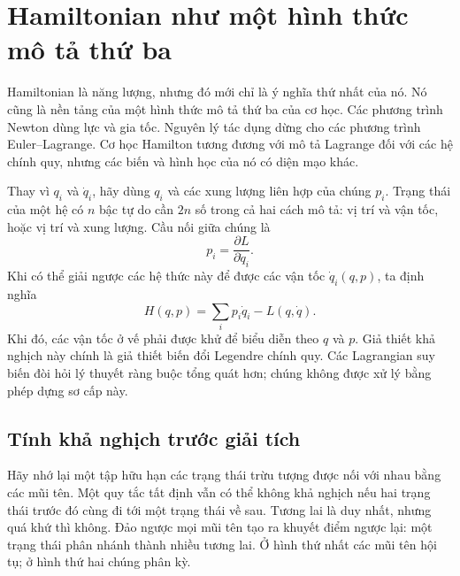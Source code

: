 \begin{classroomqa}
\end{classroomqa}

\section{Hamiltonian như một hình thức mô tả thứ ba}

Hamiltonian là năng lượng, nhưng đó mới chỉ là ý nghĩa thứ nhất của nó. Nó cũng là nền tảng của một hình thức mô tả thứ ba của cơ học. Các phương trình Newton dùng lực và gia tốc. Nguyên lý tác dụng dừng cho các phương trình Euler--Lagrange. Cơ học Hamilton tương đương với mô tả Lagrange đối với các hệ chính quy, nhưng các biến và hình học của nó có diện mạo khác.

Thay vì \(q_i\) và \(\dot q_i\), hãy dùng \(q_i\) và các xung lượng liên hợp của chúng
\(p_i\).  Trạng thái của một hệ có \(n\) bậc tự do cần \(2n\)
số trong cả hai cách mô tả: vị trí và vận tốc, hoặc vị trí và
xung lượng.  Cầu nối giữa chúng là
\begin{equation}
  p_i=\frac{\partial L}{\partial\dot q_i}.
  \label{eq:l6-legendre-map}
\end{equation}
Khi có thể giải ngược các hệ thức này để được các vận tốc
\(\dot q_i(q,p)\), ta định nghĩa
\begin{equation}
  H(q,p)=\sum_i p_i\dot q_i-L(q,\dot q).
  \label{eq:l6-hamiltonian-definition}
\end{equation}
Khi đó, các vận tốc ở vế phải được khử để biểu diễn theo \(q\) và \(p\).
Giả thiết khả nghịch này chính là giả thiết biến đổi Legendre chính quy.  Các
Lagrangian suy biến đòi hỏi lý thuyết ràng buộc tổng quát hơn; chúng không
được xử lý bằng phép dựng sơ cấp này.

\subsection{Tính khả nghịch trước giải tích}

Hãy nhớ lại một tập hữu hạn các trạng thái trừu tượng được nối với nhau bằng các mũi tên.  Một
quy tắc tất định vẫn có thể không khả nghịch nếu hai trạng thái trước đó cùng
đi tới một trạng thái về sau.  Tương lai là duy nhất, nhưng quá khứ thì không.  Đảo ngược
mọi mũi tên tạo ra khuyết điểm ngược lại: một trạng thái phân nhánh thành nhiều
tương lai.  Ở hình thứ nhất các mũi tên hội tụ; ở hình thứ hai chúng phân kỳ.

